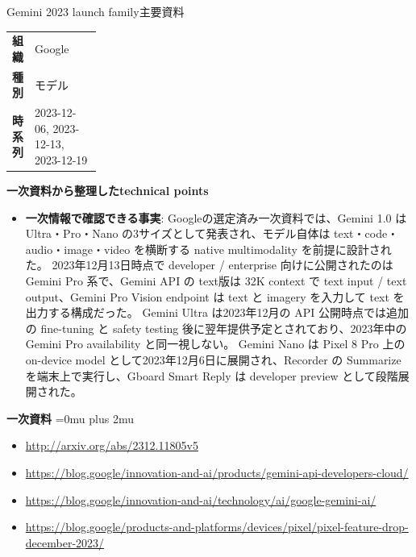 \begin{technicalnote}{Gemini 2023 launch family}{主要資料}
\begingroup
\begin{tabularx}{\linewidth}{@{}>{\bfseries}p{0.22\linewidth}X@{}}
組織 & Google \\
種別 & モデル \\
時系列 & 2023-12-06, 2023-12-13, 2023-12-19 \\
\end{tabularx}
\smallskip
{\bfseries 一次資料から整理したtechnical points}
\begin{itemize}[leftmargin=1.5em,itemsep=0.35em]
\item \textbf{一次情報で確認できる事実}: Googleの選定済み一次資料では、Gemini 1.0 は Ultra・Pro・Nano の3サイズとして発表され、モデル自体は text・code・audio・image・video を横断する native multimodality を前提に設計された。 2023年12月13日時点で developer / enterprise 向けに公開されたのは Gemini Pro 系で、Gemini API の text版は 32K context で text input / text output、Gemini Pro Vision endpoint は text と imagery を入力して text を出力する構成だった。 Gemini Ultra は2023年12月の API 公開時点では追加の fine-tuning と safety testing 後に翌年提供予定とされており、2023年中の Gemini Pro availability と同一視しない。 Gemini Nano は Pixel 8 Pro 上の on-device model として2023年12月6日に展開され、Recorder の Summarize を端末上で実行し、Gboard Smart Reply は developer preview として段階展開された。
\end{itemize}
\begin{minipage}{\linewidth}
\begin{samepage}
{\bfseries 一次資料}
\begingroup\sloppy
\Urlmuskip=0mu plus 2mu\relax
\begin{itemize}[leftmargin=1.5em,itemsep=0.25em]
\item {\scriptsize\url{http://arxiv.org/abs/2312.11805v5}}
\item {\scriptsize\url{https://blog.google/innovation-and-ai/products/gemini-api-developers-cloud/}}
\item {\scriptsize\url{https://blog.google/innovation-and-ai/technology/ai/google-gemini-ai/}}
\item {\scriptsize\url{https://blog.google/products-and-platforms/devices/pixel/pixel-feature-drop-december-2023/}}
\end{itemize}
\endgroup
\end{samepage}
\end{minipage}
\endgroup
\end{technicalnote}
\medskip

